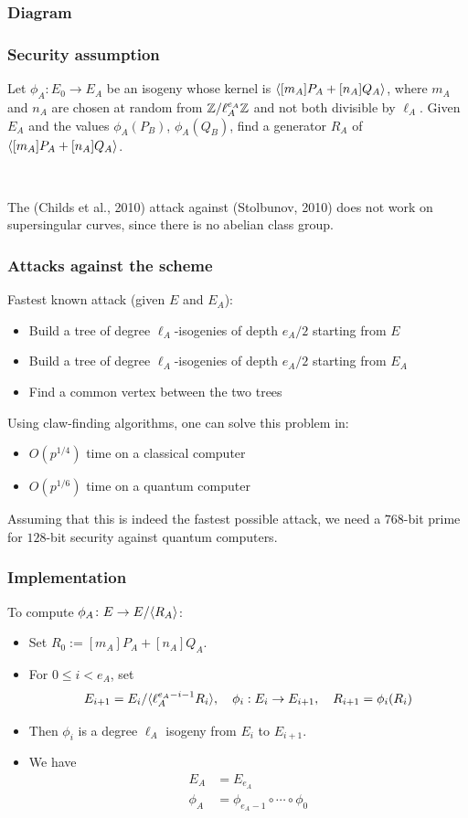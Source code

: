 \documentclass{beamer}
\begin{document}
\begin{frame}[fragile]\frametitle{Diagram}

\end{frame}

\begin{frame}
\frametitle{Security assumption}

\begin{problem} Let $\phi_A
  \colon E_0 \to E_A$ be an isogeny whose kernel is
  ${\langle [m_A]P_A+[n_A]Q_A \rangle}$, where $m_A$ and $n_A$ are chosen at
  random from $\mathbb{Z}/\ell_A^{e_A}\mathbb{Z}$ and not both divisible by $\ell_A$.
  Given $E_A$ and the values $\phi_A(P_B)$, $\phi_A(Q_B)$, find a
  generator $R_A$ of ${\langle [m_A]P_A+[n_A]Q_A \rangle}$.
\end{problem}

\ 

The (Childs et al., 2010) attack against (Stolbunov, 2010) does not
work on supersingular curves, since there is no abelian class group.

\end{frame}

\begin{frame}
\frametitle{Attacks against the scheme}
Fastest known attack (given $E$ and $E_A$):
\begin{itemize}
\item Build a tree of degree $\ell_A$-isogenies of depth $e_A/2$
  starting from $E$
\item Build a tree of degree $\ell_A$-isogenies of depth $e_A/2$
  starting from $E_A$
\item Find a common vertex between the two trees 
\end{itemize}
Using claw-finding algorithms, one can solve this problem in:
\begin{itemize}
\item $O(p^{1/4})$ time on a classical computer
\item $O(p^{1/6})$ time on a quantum computer
\end{itemize}
Assuming that this is indeed the fastest possible attack, we need a
$768$-bit prime for $128$-bit security against quantum computers.
\end{frame}

\begin{frame}
\frametitle{Implementation}
To compute $\phi_A\colon E \to E/\langle R_A\rangle$:
\begin{itemize}
\item Set $R_0 := [m_A]P_A + [n_A]Q_A$.
\item For $0\le i <e_A$, set
\begin{equation*}
  E_{i+1} = E_i/\langle\ell_A^{e_A-i-1}R_i\rangle,\quad
  \phi_i : E_i \to E_{i+1},\quad
  R_{i+1} = \phi_i(R_i)
\end{equation*}
\item Then $\phi_i$ is a degree $\ell_A$ isogeny from $E_i$ to $E_{i+1}$.
\item We have
\begin{align*}
E_A &= E_{e_A} \\
\phi_A &=\phi_{e_A-1}\circ\cdots\circ\phi_0
\end{align*}
\end{itemize}
\end{frame}
\end{document}
